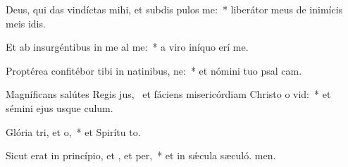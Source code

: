 \item Deus, qui das vindíctas mihi, et subdis pulos  me:~* liberátor meus de inimícis meis idis.
\item Et ab insurgéntibus in me al me:~* a viro iníquo erí me.
\item Proptérea confitébor tibi in natinibus, ne:~* et nómini tuo psal cam.
\item Magníficans salútes Regis jus,~\pscross{} et fáciens misericórdiam Christo o vid:~* et sémini ejus usque  culum.
\item Glória tri, et o,~* et Spirítu to.
\item Sicut erat in princípio, et , et per,~* et in sǽcula sæculó. men.
